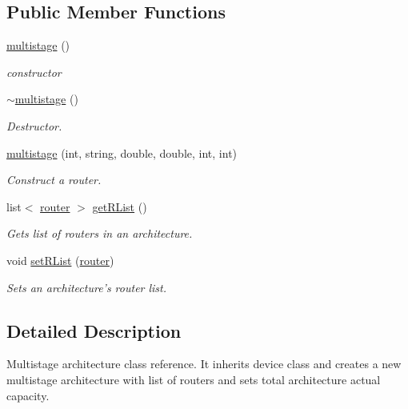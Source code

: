 \subsection*{Public Member Functions}
\begin{DoxyCompactItemize}
\item 
\hyperlink{classmultistage_abbfa555a8fbdfe7f70efa06fddbaa335}{multistage} ()
\begin{DoxyCompactList}\small\item\em constructor \item\end{DoxyCompactList}\item 
\hyperlink{classmultistage_a3ce104e1cd528efc9f4f2b8b8c2f54a7}{$\sim$multistage} ()
\begin{DoxyCompactList}\small\item\em Destructor. \item\end{DoxyCompactList}\item 
\hyperlink{classmultistage_adcbb45a38e0184f037cdc03504dced05}{multistage} (int, string, double, double, int, int)
\begin{DoxyCompactList}\small\item\em Construct a router. \item\end{DoxyCompactList}\item 
list$<$ \hyperlink{classrouter}{router} $>$ \hyperlink{classmultistage_ad42d7006ba661c60eb4958f8534ad89a}{getRList} ()
\begin{DoxyCompactList}\small\item\em Gets list of routers in an architecture. \item\end{DoxyCompactList}\item 
void \hyperlink{classmultistage_a6f79ee151acaff9a49e06a3300371a2c}{setRList} (\hyperlink{classrouter}{router})
\begin{DoxyCompactList}\small\item\em Sets an architecture's router list. \item\end{DoxyCompactList}\end{DoxyCompactItemize}


\subsection{Detailed Description}
Multistage architecture class reference. It inherits device class and creates a new multistage architecture with list of routers and sets total architecture actual capacity.

